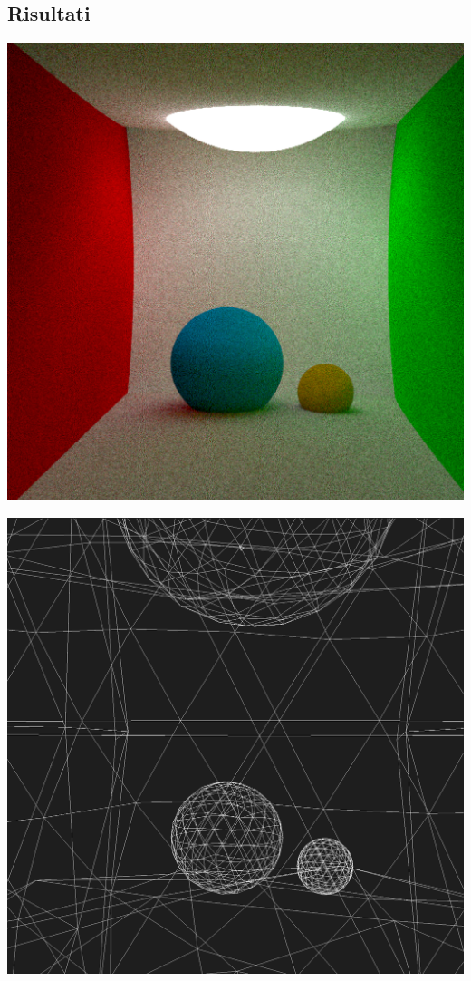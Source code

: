 \documentclass{article}
\begin{document}
\subsection{Risultati}

\begin{center}
    \begin{minipage}{0.49\textwidth}
        \includegraphics*[width=\linewidth]{../images/rendered.png}
    \end{minipage}
    \hfill
    \begin{minipage}{0.49\textwidth}
        \includegraphics*[width=\linewidth]{../images/wireframe.png}
    \end{minipage}
\end{center}
\end{document}
